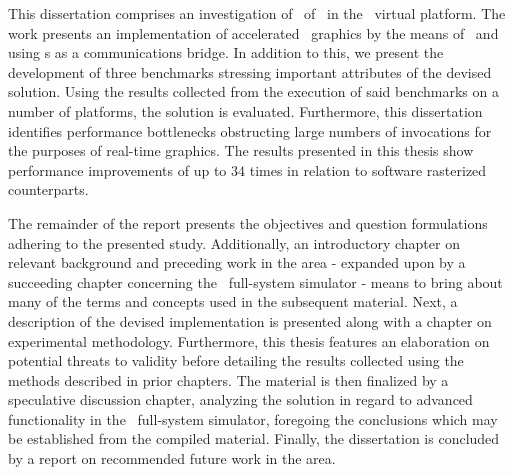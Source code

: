 This dissertation comprises an investigation of \dvttermparavirtualization\ of \dvttermopengles\ in the \dvttermsimics\ virtual platform.
The work presents an implementation of accelerated \dvttermopenglestwopointo\ graphics by the means of \dvttermparavirtualization\ and using \dvttermmagicinstruction s as a communications bridge.
In addition to this, we present the development of three benchmarks stressing important attributes of the devised solution.
Using the results collected from the execution of said benchmarks on a number of platforms, the solution is evaluated.
Furthermore, this dissertation identifies performance bottlenecks obstructing large numbers of  invocations for the purposes of real-time graphics.
The results presented in this thesis show performance improvements of up to $34$ times in relation to software rasterized counterparts.

The remainder of the report presents the objectives and question formulations adhering to the presented study.
Additionally, an introductory chapter on relevant background and preceding work in the area - expanded upon by a succeeding chapter concerning the \dvttermsimics\ full-system simulator - means to bring about many of the terms and concepts used in the subsequent material.
Next, a description of the devised  implementation is presented along with a chapter on experimental methodology.
Furthermore, this thesis features an elaboration on potential threats to validity before detailing the results collected using the methods described in prior chapters.
The material is then finalized by a speculative discussion chapter, analyzing the  solution in regard to advanced functionality in the \dvttermsimics\ full-system simulator, foregoing the conclusions which may be established from the compiled material.
Finally, the dissertation is concluded by a report on recommended future work in the area.

